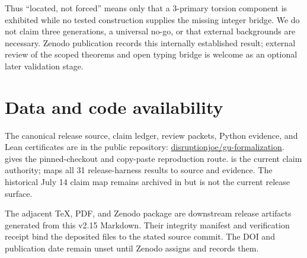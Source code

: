 \documentclass[11pt]{article}
\theoremstyle{remark}
\begin{document}
Thus ``located, not forced'' means only that a 3-primary torsion component is exhibited while no tested construction supplies the missing integer bridge. We do not claim three generations, a universal no-go, or that external backgrounds are necessary. Zenodo publication records this internally established result; external review of the scoped theorems and open typing bridge is welcome as an optional later validation stage.

\section{Data and code availability}
The canonical release source, claim ledger, review packets, Python evidence, and Lean certificates are in the public repository: \href{https://github.com/disruptionjoe/gu-formalization}{disruptionjoe/gu-formalization}.  gives the pinned-checkout and copy-paste reproduction route.  is the current claim authority;  maps all 31 release-harness results to source and evidence. The historical July 14 claim map remains archived in  but is not the current release surface.

The adjacent TeX, PDF, and Zenodo package are downstream release artifacts generated from this v2.15 Markdown. Their integrity manifest and verification receipt bind the deposited files to the stated source commit. The DOI and publication date remain unset until Zenodo assigns and records them.
\end{document}
